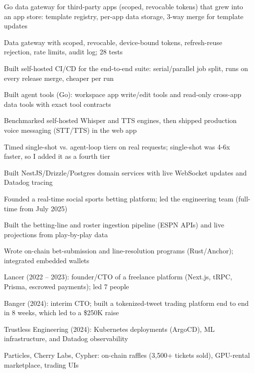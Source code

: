 \documentclass[print]{jack-resume}
\begin{document}
\begin{tightemize}
    \item Go data gateway for third-party apps (scoped, revocable tokens) that grew into an app store: template registry, per-app data storage, 3-way merge for template updates
    \item Data gateway with scoped, revocable, device-bound tokens, refresh-reuse rejection, rate limits, audit log; 28 tests
    \item Built self-hosted CI/CD for the end-to-end suite: serial/parallel job split, runs on every release merge, cheaper per run
    \item Built agent tools (Go): workspace app write/edit tools and read-only cross-app data tools with exact tool contracts
    \item Benchmarked self-hosted Whisper and TTS engines, then shipped production voice messaging (STT/TTS) in the web app
    \item Timed single-shot vs. agent-loop tiers on real requests; single-shot was 4-6x faster, so I added it as a fourth tier
\end{tightemize}
\sectionsep

\begin{tightemize}
    \item Built NestJS/Drizzle/Postgres domain services with live WebSocket updates and Datadog tracing
    \item Founded a real-time social sports betting platform; led the engineering team (full-time from July 2025)
    \item Built the betting-line and roster ingestion pipeline (ESPN APIs) and live projections from play-by-play data
    \item Wrote on-chain bet-submission and line-resolution programs (Rust/Anchor); integrated embedded wallets
\end{tightemize}
\sectionsep

\begin{tightemize}
    \item Lancer (2022 – 2023): founder/CTO of a freelance platform (Next.js, tRPC, Prisma, escrowed payments); led 7 people
    \item Banger (2024): interim CTO; built a tokenized-tweet trading platform end to end in 8 weeks, which led to a \$250K raise
    \item Trustless Engineering (2024): Kubernetes deployments (ArgoCD), ML infrastructure, and Datadog observability
    \item Particles, Cherry Labs, Cypher: on-chain raffles (3,500+ tickets sold), GPU-rental marketplace, trading UIs
\end{tightemize}
\sectionsep
\end{document}
